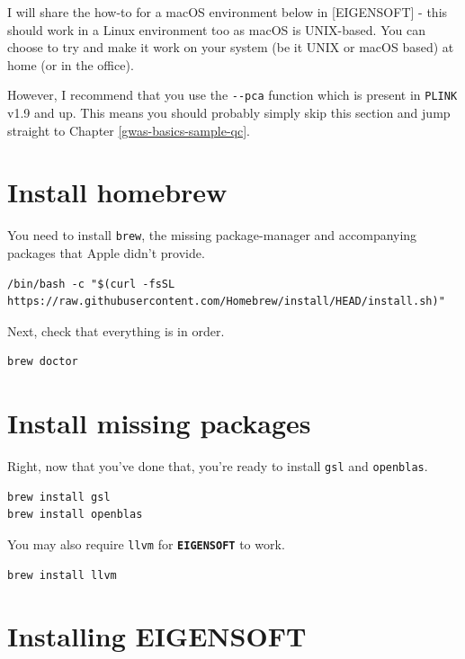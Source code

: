 \documentclass[
]{book}
\newcommand{\passthrough}[1]{#1}
\begin{document}
I will share the how-to for a macOS environment below in {[}EIGENSOFT{]} - this should work in a Linux environment too as macOS is UNIX-based. You can choose to try and make it work on your system (be it UNIX or macOS based) at home (or in the office).

However, I recommend that you use the \passthrough{\lstinline!--pca!} function which is present in \passthrough{\lstinline!PLINK!} v1.9 and up. This means you should probably simply skip this section and jump straight to Chapter \ref{gwas-basics-sample-qc}.

\hypertarget{install-homebrew}{%
\section{Install homebrew}\label{install-homebrew}}

You need to install \passthrough{\lstinline!brew!}, the missing package-manager and accompanying packages that Apple didn't provide.

\begin{lstlisting}
/bin/bash -c "$(curl -fsSL https://raw.githubusercontent.com/Homebrew/install/HEAD/install.sh)"
\end{lstlisting}

Next, check that everything is in order.

\begin{lstlisting}
brew doctor
\end{lstlisting}

\hypertarget{install-missing-packages}{%
\section{Install missing packages}\label{install-missing-packages}}

Right, now that you've done that, you're ready to install \passthrough{\lstinline!gsl!} and \passthrough{\lstinline!openblas!}.

\begin{lstlisting}
brew install gsl
brew install openblas
\end{lstlisting}

You may also require \passthrough{\lstinline!llvm!} for \textbf{\passthrough{\lstinline!EIGENSOFT!}} to work.

\begin{lstlisting}
brew install llvm
\end{lstlisting}

\hypertarget{installing-eigensoft}{%
\section{Installing EIGENSOFT}\label{installing-eigensoft}}
\end{document}
